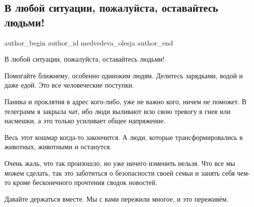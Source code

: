  
 
 
 
 
 
\subsection{В любой ситуации, пожалуйста, оставайтесь людьми!}
\label{sec:24_02_2022.tg.medvedeva_olesja.2.ostavajtes_ljudmi}
 
\ifcmt
 author_begin
   author_id medvedeva_olesja
 author_end
\fi

В любой ситуации, пожалуйста, оставайтесь людьми! 

Помогайте ближнему, особенно одиноким людям. Делитесь зарядками, водой и даже
едой. Это все человеческие поступки. 

Паника и проклятия в адрес кого-либо, уже не важно кого, ничем не поможет. В
телеграмм я закрыла чат, ибо люди выливают всю свою тревогу в гнев или
насмешки, а это только усиливает общее напряжение. 

Весь этот кошмар когда-то закончится. А люди, которые трансформировались в
животных, животными и останутся. 

Очень жаль, что так произошло, но уже ничего изменить нельзя. Что все мы можем
сделать, так это заботиться о безопасности своей семьи и занять себя чем-то
кроме бесконечного прочтения сводок новостей. 

Давайте держаться вместе. Мы с вами пережили многое, и это переживём.
